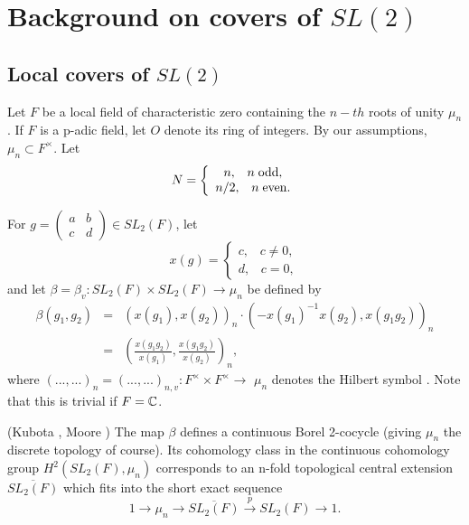 \chapter{Background on covers of $SL(2)$}

\section{Local covers of $SL(2)$}

Let $F$ be a local field of characteristic zero
containing the $n-th$ roots of unity $\mu_n$.
If $F$ is a p-adic field, let $O$ denote its ring of integers.
By our assumptions, $\mu _n\subset F^{\times }$. Let 
\begin{equation}
N=\left\{ 
\begin{array}{c}
n,\;\;\;n\;{\rm odd}, \\ 
n/2,\;\;\;n\;{\rm even}.
\end{array}
\right. 
\end{equation}

For $g=\left( 
\begin{array}{cc}
a & b \\ 
c & d
\end{array}
\right) \in SL_2(F)$, let 
\[
x(g)=\left\{ 
\begin{array}{c}
c,\;\;\;c\neq 0, \\ 
d,\;\;\;c=0,
\end{array}
\right. 
\]
and let $\beta =\beta _v:SL_2(F)\times SL_2(F)\rightarrow \mu _n$ be defined
by 
\begin{eqnarray}
\beta (g_1,g_2) &=&(x(g_1),x(g_2))_n\cdot (-x(g_1)^{-1}x(g_2),x(g_1g_2))_n \\
&=&(\frac{x(g_1g_2)}{x(g_1)},\frac{x(g_1g_2)}{x(g_2)})_n,  \nonumber
\end{eqnarray}
where $(...,...)_n=(...,...)_{n,v}:F^{\times }\times F^{\times }\rightarrow $
$\mu _n$ denotes the Hilbert symbol \cite{W1}.
Note that this is trivial if $F={\Bbb {C}}$.

\begin{lemma}
(Kubota \cite{K1}, Moore \cite{M})
The map $\beta $ defines a continuous Borel
2-cocycle (giving $\mu _n$ the discrete topology of course). Its cohomology
class in the continuous cohomology group $H^2(SL_2(F),\mu _n)$ corresponds
to an n-fold topological central extension $\overline{SL_2(F)}$ which fits
into the short exact sequence 
\[
1\rightarrow \mu _n\rightarrow \overline{SL_2(F)}\stackrel{p}{\rightarrow }%
SL_2(F)\rightarrow 1.
\]
\end{lemma}

